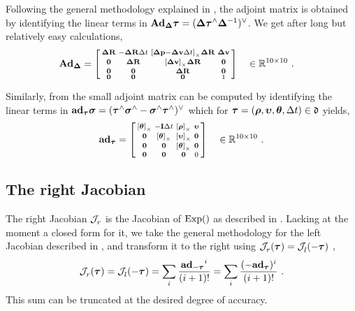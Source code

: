 %
Following the general methodology explained in \cite{sola2018micro}, the adjoint matrix is obtained by identifying the linear terms in ${\mathbf{Ad}_{{{\bm \Delta}}}}{\bm \tau}=({{\bm \Delta}}{\bm \tau}^\wedge{{\bm \Delta}}^{-1})^\vee$. 
We get after long but relatively easy calculations,
%
\begin{align}\label{eq:Ad}
{\mathbf{Ad}_{{{\bm \Delta}}}} &=
\begin{bsmallmatrix}
{\bm \Delta {\bf R}} & -{\bm \Delta {\bf R}}\Delta t & \left[{\bm \Delta {\bf p}}-{\bm \Delta {\bf v}}\Delta t\right]_\times{\bm \Delta {\bf R}} & {\bm \Delta {\bf v}} \\
\bf0 & {\bm \Delta {\bf R}} & \left[{\bm \Delta {\bf v}}\right]_\times{\bm \Delta {\bf R}} & \bf0 \\
\bf0 & \bf0 & {\bm \Delta {\bf R}} & \bf0 \\
\bf0 & \bf0 & \bf0 & 1
\end{bsmallmatrix} 
\quad
\in{\mathbb R}^{10\times10}~.
\end{align}



Similarly, from \cite{EADE-18-DERIVATIVE} the small adjoint matrix can be computed by identifying the linear terms in $
{\mathrm{\bf ad}_{{\bm \tau}}}{\bm \sigma} = 
({\bm \tau}^\wedge{\bm \sigma}^\wedge-{\bm \sigma}^\wedge{\bm \tau}^\wedge)^\vee
$
%
which  for ${\bm \tau}=({\bm \rho},{\bm \upsilon},{{\bm \theta}},\Delta t)\in\mathfrak{d}$ yields,
%
\begin{align}\label{eq:ad}
\mathrm{\bf ad}_{\bm \tau} = \begin{bsmallmatrix}
\left[{{\bm \theta}}\right]_\times & -{\bf I}\Delta t & \left[{\bm \rho}\right]_\times & {\bm \upsilon} \\
\bf0 & \left[{{\bm \theta}}\right]_\times & \left[{\bm \upsilon}\right]_\times & \bf0 \\
\bf0 & \bf0 & \left[{{\bm \theta}}\right]_\times & \bf0 \\
\bf0 & \bf0 & \bf0 & 0 
\end{bsmallmatrix}
\quad
\in{\mathbb R}^{10\times10}~.
\end{align}




\subsection{The right Jacobian}
\label{sec:imu_compact_right_jacobian}

The right Jacobian ${\mathcal{J}^{}_{r}}$ is the Jacobian of $\operatorname*{Exp}()$ as described in \cite{sola2018micro}.
Lacking at the moment a closed form for it, we take the general methodology for the left Jacobian described in \cite{EADE-18-DERIVATIVE}, and transform it to the right using ${\mathcal{J}^{}_{r}}({\bm \tau})={\mathcal{J}^{}_{l}}(-{\bm \tau})$ \cite{sola2018micro},
%
\begin{align}\label{eq:Jr}
{\mathcal{J}^{}_{r}}({\bm \tau}) 
= {\mathcal{J}^{}_{l}}(-{\bm \tau}) 
= \sum_i \frac{{\mathrm{\bf ad}_{-{\bm \tau}}}^i}{(i+1)!}
= \sum_i \frac{(-{\mathrm{\bf ad}_{{\bm \tau}}})^i}{(i+1)!}
~.
\end{align}
%
This sum can be truncated at the desired degree of accuracy.

